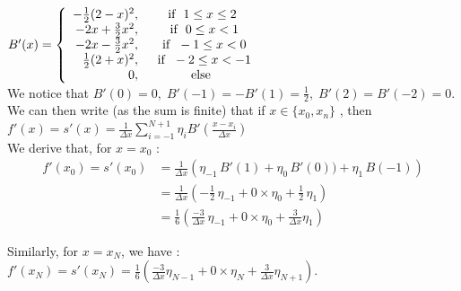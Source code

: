\documentclass[10pt]{article}
\begin{document}
$B'(x)= \left \{
 \begin{array}{r c l}
      -\frac{1}{2} (2-x)^2, & \mathrm{\: if \hspace{2 mm}} 1 \leq x \leq 2 &\\
      -2x + \frac{3}{2} x^2, & \mathrm{\;\; if \hspace{2 mm}} 0 \leq x < 1 &\\
      -2x - \frac{3}{2} x^2, &  \mathrm{\;\; if \hspace{2 mm}} -1 \leq x < 0  \\
      \frac{1}{2} (2+x)^2, &  \mathrm{\;\; if \hspace{2 mm}} -2 \leq x < -1 &\\
      0, & \mathrm{else}
 \end{array}
   \right. $\\

We notice that $B'(0) = 0, \; B'(-1) = -B'(1) = \frac{1}{2}, \; B'(2) = B'(-2) = 0$. \\

We can then write (as the sum is finite) that if $x \in \lbrace x_0, x_n \rbrace $ , then $f'(x) = s'(x)= \frac{1}{\Delta x} \sum_{i=-1}^{N+1} \eta_i B'(\frac{x-x_i}{\Delta x})$\\

We derive that, for $ x = x_0$ :
\begin{align*}
f'(x_0) = s'(x_0) &=  \frac{1}{\Delta x} \left( \eta_{-1}\, B'(1) + \eta_{0}\, B'(0) ) + \eta_1\, B(-1) \right)\\
&= \frac{1}{\Delta x} \left( -\frac{1}{2}\, \eta_{-1} + 0 \times \eta_0 + \frac{1}{2}\, \eta_{1} \right)\\
&=  \frac{1}{6} \left( \frac{-3}{\Delta x}\, \eta_{-1} + 0 \times \eta_0 + \frac{3}{\Delta x} \eta_{1} \right)
\end{align*}

Similarly, for $x=x_N$, we have : $f'(x_N) = s'(x_N) = \frac{1}{6} \left( \frac{-3}{\Delta x} \eta_{N-1} + 0 \times \eta_N + \frac{3}{\Delta x} \eta_{N+1} \right)$.
\end{document}
